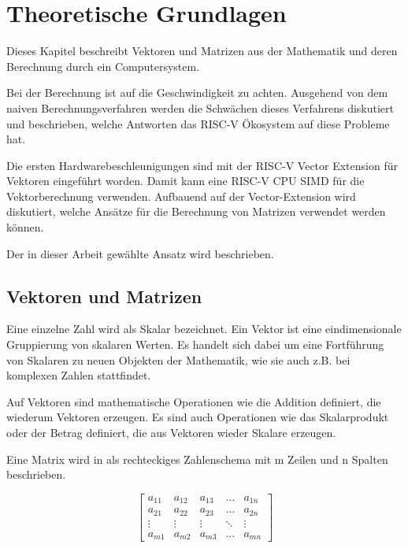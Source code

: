 \chapter{Theoretische Grundlagen} \label{chpt:Theoretische_Grundlagen_Main}

Dieses Kapitel beschreibt Vektoren und Matrizen aus der Mathematik und deren Berechnung durch ein Computersystem.

Bei der Berechnung ist auf die Geschwindigkeit zu achten. Ausgehend von dem naiven Berechnungsverfahren werden die Schwächen dieses Verfahrens diskutiert und beschrieben, welche Antworten das RISC-V Ökosystem auf diese Probleme hat.

Die ersten Hardwarebeschleunigungen sind mit der RISC-V Vector Extension für Vektoren eingeführt worden. Damit kann eine RISC-V CPU \gls{SIMD} für die Vektorberechnung verwenden. Aufbauend auf der Vector-Extension wird diskutiert, welche Ansätze für die Berechnung von Matrizen verwendet werden können.

Der in dieser Arbeit gewählte Ansatz wird beschrieben.




\section{Vektoren und Matrizen} \label{sec:vectors_and_matrices}

Eine einzelne Zahl wird als Skalar bezeichnet. Ein Vektor ist eine eindimensionale Gruppierung von skalaren Werten. Es handelt sich dabei um eine Fortführung von Skalaren zu neuen Objekten der Mathematik, wie sie auch z.B. bei komplexen Zahlen stattfindet.

Auf Vektoren sind mathematische Operationen wie die Addition definiert, die wiederum Vektoren erzeugen. Es sind auch Operationen wie das Skalarprodukt oder der Betrag definiert, die aus Vektoren wieder Skalare erzeugen.

Eine Matrix wird in \cite{Mathematik_Arens} als rechteckiges Zahlenschema mit m Zeilen und n Spalten beschrieben.

\[
\begin{bmatrix}
    a_{11} & a_{12} & a_{13} & \dots  & a_{1n} \\
    a_{21} & a_{22} & a_{23} & \dots  & a_{2n} \\
    \vdots & \vdots & \vdots & \ddots & \vdots \\
    a_{m1} & a_{m2} & a_{m3} & \dots  & a_{mn}
\end{bmatrix}
\]

